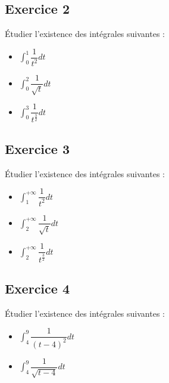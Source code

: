 \documentclass[letterpaper,10pt,french]{sphinxmanual}
\begin{document}
\subsection{Exercice 2}
\label{\detokenize{exo3:exercice-2}}
\sphinxAtStartPar
Étudier l’existence des intégrales suivantes :
\begin{itemize}
\item {} 
\sphinxAtStartPar
\(\int_0^1 \dfrac{1}{t^2}dt\)

\item {} 
\sphinxAtStartPar
\(\int_0^2 \dfrac{1}{\sqrt{t}}dt\)

\item {} 
\sphinxAtStartPar
\(\int_0^3 \dfrac{1}{t^\frac{3}{2}}dt\)

\end{itemize}


\subsection{Exercice 3}
\label{\detokenize{exo3:exercice-3}}
\sphinxAtStartPar
Étudier l’existence des intégrales suivantes :
\begin{itemize}
\item {} 
\sphinxAtStartPar
\(\int_1^{+\infty} \dfrac{1}{t^2}dt\)

\item {} 
\sphinxAtStartPar
\(\int_2^{+\infty} \dfrac{1}{\sqrt{t}}dt\)

\item {} 
\sphinxAtStartPar
\(\int_2^{+\infty} \dfrac{1}{t^\frac{3}{2}}dt\)

\end{itemize}


\subsection{Exercice 4}
\label{\detokenize{exo3:exercice-4}}
\sphinxAtStartPar
Étudier l’existence des intégrales suivantes :
\begin{itemize}
\item {} 
\sphinxAtStartPar
\(\int_4^9 \dfrac{1}{(t-4)^2}dt\)

\item {} 
\sphinxAtStartPar
\(\int_4^9 \dfrac{1}{\sqrt{t-4}}dt\)

\end{itemize}
\end{document}
